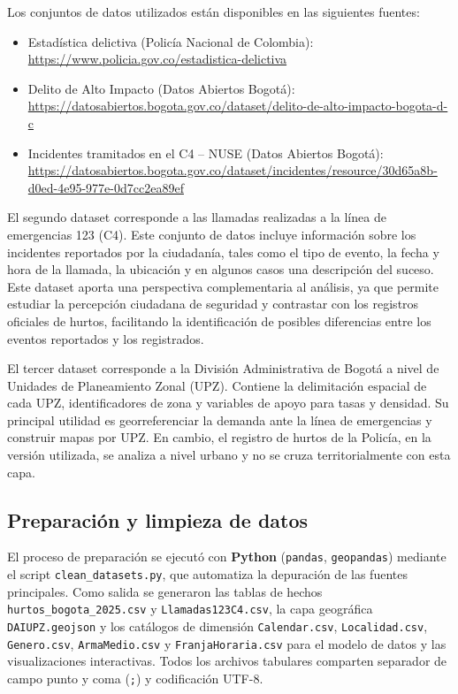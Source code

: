 \documentclass[12pt,letterpaper]{article}
\begin{document}
Los conjuntos de datos utilizados están disponibles en las siguientes fuentes:
\begin{itemize}[noitemsep, topsep=0pt]
    \item Estadística delictiva (Policía Nacional de Colombia): \url{https://www.policia.gov.co/estadistica-delictiva}
    \item Delito de Alto Impacto (Datos Abiertos Bogotá): \url{https://datosabiertos.bogota.gov.co/dataset/delito-de-alto-impacto-bogota-d-c}
    \item Incidentes tramitados en el C4 -- NUSE (Datos Abiertos Bogotá): \url{https://datosabiertos.bogota.gov.co/dataset/incidentes/resource/30d65a8b-d0ed-4e95-977e-0d7cc2ea89ef}
\end{itemize}

El segundo dataset corresponde a las llamadas realizadas a la línea de emergencias 123 (C4). Este conjunto de datos incluye información sobre los incidentes reportados por la ciudadanía, tales como el tipo de evento, la fecha y hora de la llamada, la ubicación y en algunos casos una descripción del suceso. Este dataset aporta una perspectiva complementaria al análisis, ya que permite estudiar la percepción ciudadana de seguridad y contrastar con los registros oficiales de hurtos, facilitando la identificación de posibles diferencias entre los eventos reportados y los registrados.

El tercer dataset corresponde a la División Administrativa de Bogotá a nivel de Unidades de Planeamiento Zonal (UPZ). Contiene la delimitación espacial de cada UPZ, identificadores de zona y variables de apoyo para tasas y densidad. Su principal utilidad es georreferenciar la demanda ante la línea de emergencias y construir mapas por UPZ. En cambio, el registro de hurtos de la Policía, en la versión utilizada, se analiza a nivel urbano y no se cruza territorialmente con esta capa.

\subsection{Preparación y limpieza de datos}

El proceso de preparación se ejecutó con \textbf{Python} (\texttt{pandas}, \texttt{geopandas}) mediante el script \texttt{clean\_datasets.py}, que automatiza la depuración de las fuentes principales. Como salida se generaron las tablas de hechos \texttt{hurtos\_bogota\_2025.csv} y \texttt{Llamadas123C4.csv}, la capa geográfica \texttt{DAIUPZ.geojson} y los catálogos de dimensión \texttt{Calendar.csv}, \texttt{Localidad.csv}, \texttt{Genero.csv}, \texttt{ArmaMedio.csv} y \texttt{FranjaHoraria.csv} para el modelo de datos y las visualizaciones interactivas. Todos los archivos tabulares comparten separador de campo punto y coma (\texttt{;}) y codificación UTF-8.
\end{document}
